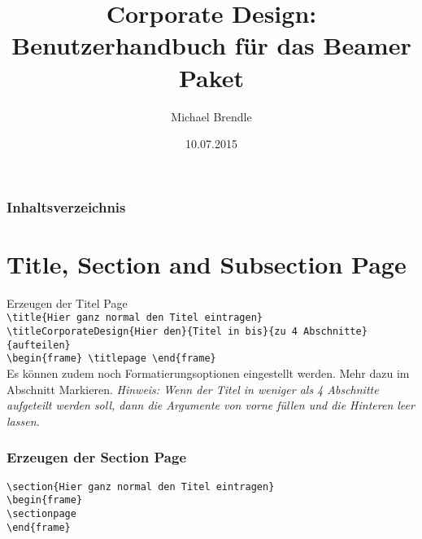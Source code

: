 \documentclass[rgb]{beamer}
\begin{document}
\setmainfont{Arial}
\setsansfont{Arial}


\title{Corporate Design: Benutzerhandbuch für das Beamer Paket}
\author{Michael Brendle} 
\date{10.07.2015}


\begin{frame}
	\titlepage
\end{frame}


\begin{frame}[t]
	\frametitle{Inhaltsverzeichnis}
	\tableofcontents
\end{frame}


\section{Title, Section and Subsection Page}

\begin{frame}[t]
	\sectionpage
		\textcolor{seeblau100}{Erzeugen der Titel Page}\\
	\vskip 18pt
	\texttt{\textbackslash title\{Hier ganz normal den Titel eintragen\}}\\
	\texttt{\textbackslash titleCorporateDesign\{Hier den\}\{Titel in bis\}\{zu 4 Abschnitte\}\{aufteilen\}}\\
	\vskip 18pt
	\texttt{\textbackslash begin\{frame\} \textbackslash titlepage \textbackslash end\{frame\}}\\
	\vskip 18pt
	Es können zudem noch Formatierungsoptionen eingestellt werden. Mehr dazu im Abschnitt Markieren.
	\vskip 18pt
	\textit{Hinweis: Wenn der Titel in weniger als 4 Abschnitte aufgeteilt werden soll, dann die Argumente von vorne füllen und die Hinteren leer lassen.}
	\vskip 18pt
\end{frame}


\begin{frame}[t]
	\frametitle{Erzeugen der Section Page}
	\vskip 18pt
	\texttt{\textbackslash section\{Hier ganz normal den Titel eintragen\}}\\
	\vskip 18pt
	\texttt{\textbackslash begin\{frame\}}\\
	\texttt{\textbackslash sectionpage }\\
	\texttt{\textbackslash end\{frame\}}\\	\vskip 18pt
\end{frame}
\end{document}
